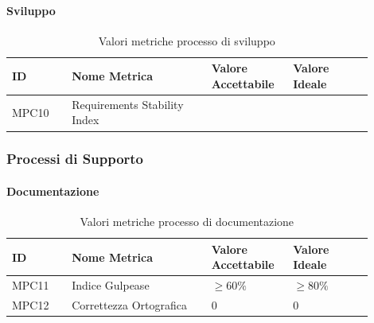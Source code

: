 \documentclass[a4paper,12pt]{article}
\begin{document}
                    \paragraph{Sviluppo} \mbox{}

                        \begin{longtable}{|M{0.15\linewidth}|M{0.35\linewidth}|M{0.2\linewidth}|M{0.2\linewidth}|}

                        \caption{Valori metriche processo di sviluppo} \\
                        \hline
                        \textbf{ID} & \textbf{Nome Metrica} & \textbf{Valore Accettabile} & \textbf{Valore Ideale} \\
                        \hline
                        \endhead

                        MPC10 & Requirements Stability Index & &  \\
                        \hline

                    \end{longtable}


            \subsubsection{Processi di Supporto}
                \paragraph{Documentazione} \mbox{}
                    \begin{longtable}{|M{0.15\linewidth}|M{0.35\linewidth}|M{0.2\linewidth}|M{0.2\linewidth}|}

                        \caption{Valori metriche processo di documentazione} \\
                        \hline
                        \textbf{ID} & \textbf{Nome Metrica} & \textbf{Valore Accettabile} & \textbf{Valore Ideale} \\
                        \hline
                        \endhead

                        MPC11 & Indice Gulpease & $\ge 60\%$ & $\ge 80\%$ \\
                        \hline

                        MPC12 & Correttezza Ortografica & $0$ & $0$ \\
                        \hline

                    \end{longtable}
\end{document}
